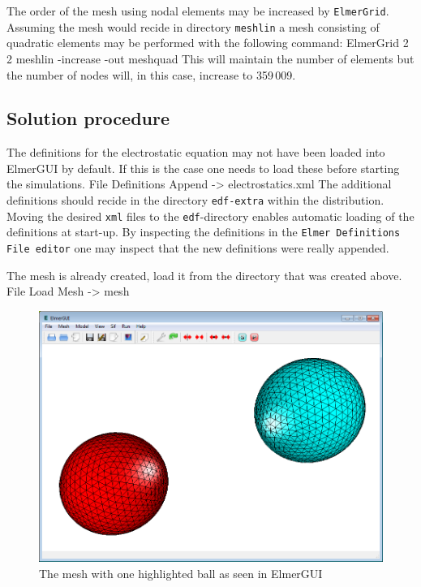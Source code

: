 The order of the mesh using nodal elements 
may be increased by \texttt{ElmerGrid}. Assuming the mesh would recide in directory \texttt{meshlin}
a mesh consisting of quadratic elements may be performed with the following command:
\ttbegin
ElmerGrid 2 2 meshlin -increase -out meshquad
\ttend
This will maintain the number of elements but the number of nodes will, in this case, increase to 359\,009. 


\subsection*{Solution procedure}

The definitions for the electrostatic equation may not have been loaded into ElmerGUI by default. If this is the case 
one needs to load these before starting the simulations.
\ttbegin
File 
  Definitions
    Append -> electrostatics.xml
\ttend
The additional definitions should recide in the directory \texttt{edf-extra} within the distribution.
Moving the desired \texttt{xml} files to the \texttt{edf}-directory enables automatic loading of the 
definitions at start-up. By inspecting the definitions in the \texttt{Elmer Definitions File editor} one
may inspect that the new definitions were really appended. 


The mesh is already created, load it from the directory that was created above.
\ttbegin
File 
  Load Mesh -> mesh
\ttend

\begin{figure}[h]
\centering
\includegraphics[width=140mm]{ElmerGUI_capture}
\caption{The mesh with one highlighted ball as seen in ElmerGUI}\label{fg:ballselmergui}
\end{figure}  


